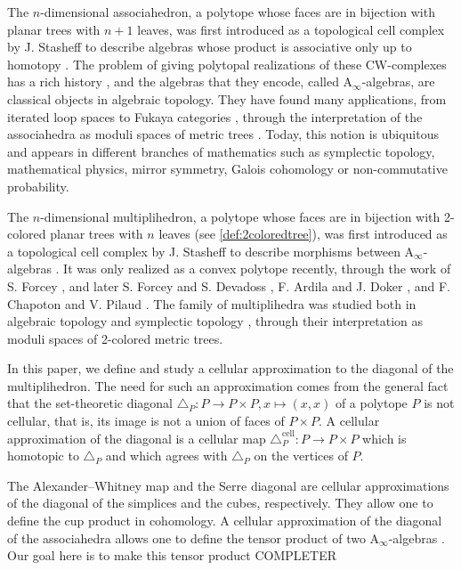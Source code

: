 \documentclass[twoside, 12pt]{amsart}
\theoremstyle{remark}
\begin{document}
The $n$-dimensional associahedron, a polytope whose faces are in bijection with planar trees with $n+1$ leaves, was first introduced as a topological cell complex by J. Stasheff to describe algebras whose product is associative only up to homotopy \cite{Stasheff63}.
The problem of giving polytopal realizations of these CW-complexes has a rich history \cite{CeballosZiegler12}, and the algebras that they encode, called $\mathrm{A}_\infty$-algebras, are classical objects in algebraic topology. 
They have found many applications, from iterated loop spaces \cite{May72} to Fukaya categories \cite{Seidel08}, through the interpretation of the associahedra as moduli spaces of metric trees \cite{MauWoodward10}.
Today, this notion is ubiquitous and appears in different branches of mathematics such as symplectic topology, mathematical physics, mirror symmetry, Galois cohomology or non-commutative probability.

\medskip

The $n$-dimensional multiplihedron, a polytope whose faces are in bijection with 2-colored planar trees with $n$ leaves (see \cref{def:2coloredtree}), was first introduced as a topological cell complex by J. Stasheff to describe morphisms between $\mathrm{A}_\infty$-algebras \cite{Stasheff70}.
It was only realized as a convex polytope recently, through the work of S. Forcey \cite{Forcey08}, and later S. Forcey and S. Devadoss \cite{DevadossForcey08}, F. Ardila and J. Doker \cite{AD13}, and F. Chapoton and V. Pilaud \cite{CP22}.
The family of multiplihedra was studied both in algebraic topology \cite{BoardmanVogt73} and symplectic topology \cite{MauWoodward10,Mazuir21}, through their interpretation as moduli spaces of 2-colored metric trees. 

\medskip

In this paper, we define and study a cellular approximation to the diagonal of the multiplihedron. 
The need for such an approximation comes from the general fact that the set-theoretic diagonal $\triangle_P:P\to P\times P, x\mapsto (x,x)$ of a polytope $P$ is not cellular, that is, its image is not a union of faces of $P\times P$. 
A cellular approximation of the diagonal is a cellular map $\triangle_P^{\textrm{cell}} : P \to P\times P$ which is homotopic to $\triangle_P$ and which agrees with $\triangle_P$ on the vertices of $P$.

\medskip

The Alexander--Whitney map \cite{EilenbergMacLane53} and the Serre diagonal \cite{Serre51} are cellular approximations of the diagonal of the simplices and the cubes, respectively. 
They allow one to define the cup product in cohomology.
A cellular approximation of the diagonal of the associahedra allows one to define the tensor product of two $\mathrm{A}_\infty$-algebras \cite{SaneblidzeUmble04,MarklShnider06,MTTV19}. 
Our goal here is to make this tensor product COMPLETER
\end{document}
